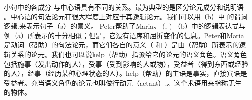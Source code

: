 小句中的各成分 与中心语具有不同的关系。最为典型的是区分论元成分和说明语
。中心语的句法论元在很大程度上对应于其逻辑论元。我们可以用（b）中
的谓词逻辑.来表示句子（a）的意义。
\eal
\ex Peter帮助了Maria。
\ex {}(, )
\zl
（b）中的逻辑表达式与例（a）所表示的十分相似；但是，它没有语序和屈折变化的信息。Peter和Maria是动词（帮助）的句法论元，而它们各自的意义（ 和 ）是由（帮助）所表示的逻辑关系的论元。我们也可以说help（帮助）指派给它的论元的语义角色。语义角色包括施事（发出动作的人），受事（受到影响的人或物），受益者（得到东西或经验的人），经事（经历某种心理状态的人）。help（帮助）的主语是事实，直接宾语是受益者。充当语义角色的论元也叫做行动元（actant）.。这个术语用来指称无生的物体。

